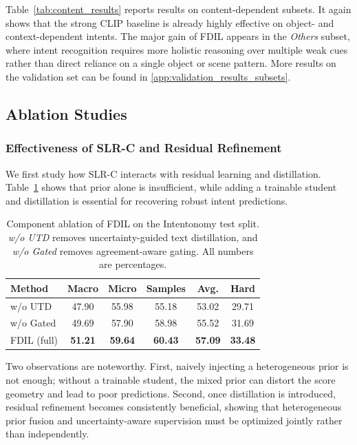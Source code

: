 Table~\ref{tab:content_results} reports results on content-dependent subsets.
It again shows that the strong CLIP baseline is already highly effective on object- and context-dependent intents. The major gain of FDIL appears in the \textit{Others} subset, where intent recognition requires more holistic reasoning over multiple weak cues rather than direct reliance on a single object or scene pattern. More results on the validation set can be found in \ref{app:validation_results_subsets}.

\subsection{Ablation Studies}

\subsubsection{Effectiveness of SLR-C and Residual Refinement}

We first study how SLR-C interacts with residual learning and distillation. Table~\ref{tab:slrc_ablation} shows that prior alone is insufficient, while adding a trainable student and distillation is essential for recovering robust intent predictions.
\begin{table}[t]
\centering
\caption{Component ablation of FDIL on the Intentonomy test split. \textit{w/o UTD} removes uncertainty-guided text distillation, and \textit{w/o Gated} removes agreement-aware gating. All numbers are percentages.}
\label{tab:slrc_ablation}
\begin{tabular}{lccccc}
\hline
Method & Macro & Micro & Samples & Avg. & Hard \\
\hline
w/o UTD & 47.90 & 55.98 & 55.18 & 53.02 & 29.71 \\
w/o Gated & 49.69 & 57.90 & 58.98 & 55.52 & 31.69 \\
FDIL (full) & \textbf{51.21} & \textbf{59.64} & \textbf{60.43} & \textbf{57.09} & \textbf{33.48} \\
\hline
\end{tabular}
\end{table}

Two observations are noteworthy. First, naively injecting a heterogeneous prior is not enough; without a trainable student, the mixed prior can distort the score geometry and lead to poor predictions. Second, once distillation is introduced, residual refinement becomes consistently beneficial, showing that heterogeneous prior fusion and uncertainty-aware supervision must be optimized jointly rather than independently.

